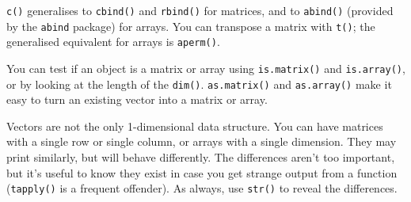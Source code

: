 \begin{Shaded}
\begin{Highlighting}[]
\StringTok{ }\NormalTok{(}\NormalTok{, }\NormalTok{)}
\StringTok{ }\NormalTok{(}\NormalTok{, }\NormalTok{, }\NormalTok{)}

\StringTok{ }\NormalTok{(}\NormalTok{(}\NormalTok{, }\NormalTok{), }\NormalTok{(}\NormalTok{, }\NormalTok{, }\NormalTok{), }\NormalTok{(}\NormalTok{, }\NormalTok{))}
\CommentTok{#> }
\CommentTok{#> }
\CommentTok{#> }
\end{Highlighting}
\end{Shaded}

\texttt{c()} generalises to \texttt{cbind()} and \texttt{rbind()} for
matrices, and to \texttt{abind()} (provided by the \texttt{abind}
package) for arrays. You can transpose a matrix with \texttt{t()}; the
generalised equivalent for arrays is \texttt{aperm()}. 
  

You can test if an object is a matrix or array using
\texttt{is.matrix()} and \texttt{is.array()}, or by looking at the
length of the \texttt{dim()}. \texttt{as.matrix()} and
\texttt{as.array()} make it easy to turn an existing vector into a
matrix or array.

Vectors are not the only 1-dimensional data structure. You can have
matrices with a single row or single column, or arrays with a single
dimension. They may print similarly, but will behave differently. The
differences aren't too important, but it's useful to know they exist in
case you get strange output from a function (\texttt{tapply()} is a
frequent offender). As always, use \texttt{str()} to reveal the
differences. 

